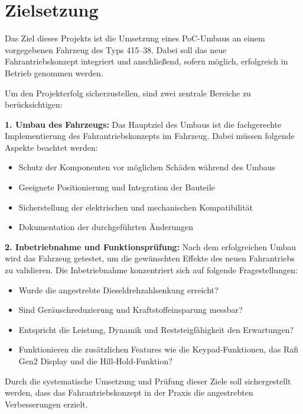 \documentclass[a4paper, 12pt]{article} %
\begin{document}
\section{Zielsetzung}
\begin{spacing}{1.5}  %
    \fontsize{14pt}{14pt}\selectfont  %

Das Ziel dieses Projekts ist die Umsetzung eines \ac{PoC}-Umbaus
 an einem vorgegebenen Fahrzeug des Typs 415–38. 
 Dabei soll das neue Fahrantriebskonzept integriert und anschließend, 
 sofern möglich, erfolgreich in Betrieb genommen werden.

Um den Projekterfolg sicherzustellen,
 sind zwei zentrale Bereiche zu berücksichtigen:

\textbf{1. Umbau des Fahrzeugs:}
Das Hauptziel des Umbaus ist die fachgerechte 
Implementierung des Fahrantriebskonzepts im Fahrzeug. 
Dabei müssen folgende Aspekte beachtet werden:

\begin{itemize}
    \item Schutz der Komponenten vor möglichen Schäden während des Umbaus
    \item Geeignete Positionierung und Integration der Bauteile
    \item Sicherstellung der elektrischen und mechanischen Kompatibilität
    \item Dokumentation der durchgeführten Änderungen
\end{itemize}

\textbf{2. Inbetriebnahme und Funktionsprüfung:}
Nach dem erfolgreichen Umbau wird das Fahrzeug getestet, 
um die gewünschten Effekte des neuen Fahrantriebs 
zu validieren. Die Inbetriebnahme konzentriert sich auf folgende Fragestellungen:

\begin{itemize}
    \item Wurde die angestrebte Dieseldrehzahlsenkung erreicht?
    \item Sind Geräuschreduzierung und Kraftstoffeinsparung messbar?
    \item Entspricht die Leistung, Dynamik und Reststeigfähigkeit den Erwartungen?
    \item Funktionieren die zusätzlichen Features wie die Keypad-Funktionen, das Rafi Gen2 Display und die Hill-Hold-Funktion?
\end{itemize}

Durch die systematische Umsetzung und Prüfung dieser 
Ziele soll sichergestellt werden, dass das Fahrantriebskonzept 
in der Praxis die angestrebten Verbesserungen erzielt.
\end{spacing}
\end{document}
